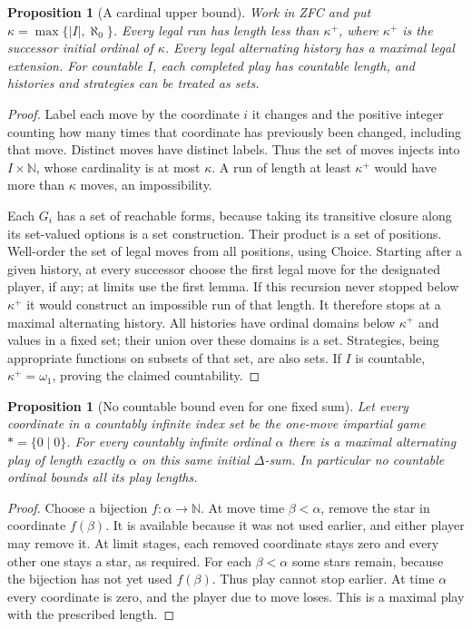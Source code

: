\documentclass[11pt]{article}
\newtheorem{proposition}[theorem]{Proposition}
\theoremstyle{definition}
\newcommand{\N}{\mathbb N}
\begin{document}
\begin{proposition}[A cardinal upper bound]
Work in ZFC and put $\kappa=\max\{|I|,\aleph_0\}$. Every legal run has length less than $\kappa^+$, where $\kappa^+$ is the successor initial ordinal of $\kappa$. Every legal alternating history has a maximal legal extension. For countable $I$, each completed play has countable length, and histories and strategies can be treated as sets.
\end{proposition}
\begin{proof}
Label each move by the coordinate $i$ it changes and the positive integer counting how many times that coordinate has previously been changed, including that move. Distinct moves have distinct labels. Thus the set of moves injects into $I\times\N$, whose cardinality is at most $\kappa$. A run of length at least $\kappa^+$ would have more than $\kappa$ moves, an impossibility.

Each $G_i$ has a set of reachable forms, because taking its transitive closure along its set-valued options is a set construction. Their product is a set of positions. Well-order the set of legal moves from all positions, using Choice. Starting after a given history, at every successor choose the first legal move for the designated player, if any; at limits use the first lemma. If this recursion never stopped below $\kappa^+$ it would construct an impossible run of that length. It therefore stops at a maximal alternating history. All histories have ordinal domains below $\kappa^+$ and values in a fixed set; their union over these domains is a set. Strategies, being appropriate functions on subsets of that set, are also sets. If $I$ is countable, $\kappa^+=\omega_1$, proving the claimed countability.
\end{proof}

\begin{proposition}[No countable bound even for one fixed sum]
Let every coordinate in a countably infinite index set be the one-move impartial game $*=\{0\mid0\}$. For every countably infinite ordinal $\alpha$ there is a maximal alternating play of length exactly $\alpha$ on this same initial $\Delta$-sum. In particular no countable ordinal bounds all its play lengths.
\end{proposition}
\begin{proof}
Choose a bijection $f:\alpha\to\N$. At move time $\beta<\alpha$, remove the star in coordinate $f(\beta)$. It is available because it was not used earlier, and either player may remove it. At limit stages, each removed coordinate stays zero and every other one stays a star, as required. For each $\beta<\alpha$ some stars remain, because the bijection has not yet used $f(\beta)$. Thus play cannot stop earlier. At time $\alpha$ every coordinate is zero, and the player due to move loses. This is a maximal play with the prescribed length.
\end{proof}
\end{document}
